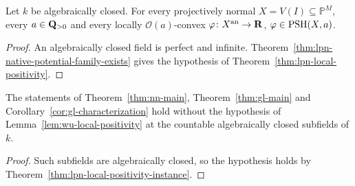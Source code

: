\begin{theorem}\label{thm:lpn-local-positivity-instance}
\leanok
{}
Let $k$ be algebraically closed. For every projectively normal $X=V(I)\subseteq\mathbb P^M$, every $a\in\mathbf{Q}_{>0}$ and
every locally $\mathcal O(a)$-convex $\varphi\colon X^{\mathrm{an}}\to\mathbf{R}$, $\varphi\in\operatorname{PSH}(X,a)$.
\end{theorem}

\begin{proof}
An algebraically closed field is perfect and infinite. Theorem~\ref{thm:lpn-native-potential-family-exists} gives the
hypothesis of Theorem~\ref{thm:lpn-local-positivity}.
\end{proof}

\begin{theorem}\label{thm:lpn-main-unconditional}
\leanok
{}
The statements of Theorem~\ref{thm:nn-main}, Theorem~\ref{thm:gl-main} and Corollary~\ref{cor:gl-characterization} hold
without the hypothesis of Lemma~\ref{lem:wu-local-positivity} at the countable algebraically closed subfields of $k$.
\end{theorem}

\begin{proof}
Such subfields are algebraically closed, so the hypothesis holds by Theorem~\ref{thm:lpn-local-positivity-instance}.
\end{proof}
